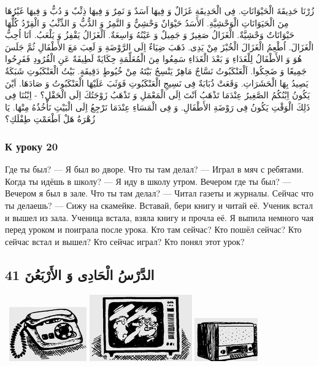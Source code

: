 \documentclass[a5paper]{article}
\begin{document}
زُرْنَا حَدِيقَةَ الْحَيْوَانَاتِ. فِى الْحَدِيقَةِ غَزَالٌ وَ فِيهَا اَسَدٌ وَ نَمِرٌ وَ فِيهَا ذِئْبٌ وَ دُبٌّ وَ فِيهَا غَيْرُهَا مِنَ الْحَيَوَانَاتِ الْوَحْشِيَّةِ. اَلأَسَدُ حَيْوَانٌ وَحْشِيٌّ وَ النَّمِرُ وَ الدُّبُّ وَ الذِّئْبُ وَ الْقِرْدُ كُلُّهَا حَيْوَانَاتٌ وَحْشِيَّةٌ. الْغَزَالُ صَغِيرٌ وَ جَمِيلٌ وَ عَيْنُهُ وَاسِعَةٌ. اَلْغَزَالُ يَقْفِزُ وَ يَلْعَبُ. اَنَا اُحِبُّ الْغَزَالَ. اُطْعِمُ الْغَزَالَ الْخُبْزَ مِنْ يَدِى. ذَهَبَ ضِيَاءٌ اِلَى الرَّوْضَةِ وَ لَعِبَ مَعَ الأَطْفَالِ ثُمَّ جَلَسَ هُوَ وَ الأَطْفَالُ لِلْغَدَاءِ وَ بَعْدَ الْغَدَاءِ سَمِعُوا مِنَ الْمُعَلِّمَةِ حِكَايَةً لَطِيفَةً عَنِ الْقُرُودِ فَفَرِحُوا جَمِيعًا وَ ضَحِكُوا. اَلْعَنْكَبُوتُ نَسَّاجٌ مَاهِرٌ يَنْسِجُ بَيْتَهُ مِنْ خُيُوطٍ دَقِيقَةٍ. بَيْتُ الْعَنْكَبُوتِ شَبَكَةٌ يَصِيدُ بِهَا الْحَشَرَاتِ. وَقَعَتْ ذُبَابَةٌ فِى نَسِيجِ الْعَنْكَبُوتِ فَوَثَبَ عَلَيْهَا الْعَنْكَبُوتُ وَ صَادَهَا. اَيْنَ يَكُونُ اِبْنُكُمُ الصَّغِيرُ عِنْدَمَا تَذْهَبُ اَنْتَ اِلَى الْمَعْمَلِ وَ تَذْهَبُ زَوْجَتُكَ اِلَى الْحَقْلِ؟ - اِبْنُنَا فِى ذَلِكَ الْوَقْتِ يَكُونُ فِى رَوْضَةِ الأَطْفَالِ. وَ فِى الْمَسَاءِ عِنْدَمَا نَرْجِعُ اِلَى الْبَيْتِ نَأْخُذُهُ مِنْهَا. يَا زُهْرَةُ هَلْ اَطْعَمْتِ طِفْلَكِ؟

\subsubsection{К уроку 20}
Где ты был? — Я был во дворе. Что ты там делал? — Играл в мяч с ребятами. Когда ты идёшь в школу? — Я иду в школу утром. Вечером где ты был? — Вечером я был в зале. Что ты там де­лал? — Читал газеты и журналы. Сейчас что ты делаешь? — Сижу на скамейке. Вставай, бери книгу и читай её. Ученик встал и вышел из зала. Ученица встала, взяла книгу и прочла её. Я выпила немного чая перед уроком и поиграла после урока. Кто там сейчас? Кто пошёл сейчас? Кто сейчас встал и вышел? Кто сейчас играл? Кто понял этот урок?

\subsection{الدَّرْسُ الْحَادِى وَ الأَرْبَعُنَ 41}
\  \includegraphics[width=1.3126in,height=0.9165in]{MuhammadBagauddinlatinized-img122.png}   \includegraphics[width=1.7398in,height=1.1252in]{MuhammadBagauddinlatinized-img123.png}   \includegraphics[width=1.0728in,height=0.7291in]{MuhammadBagauddinlatinized-img124.png} 
\end{document}
